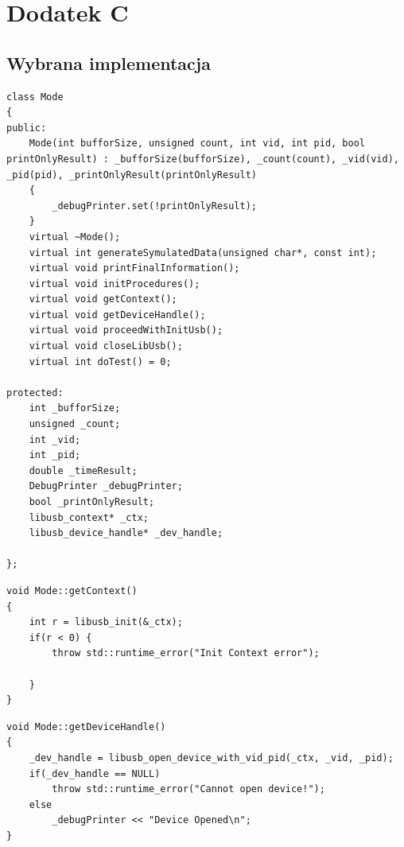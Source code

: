 \documentclass{BscUS}
\begin{document}
\chapter*{Dodatek C} \label{App:AppendixB}
\section*{Wybrana implementacja}


\begin{lstlisting}[caption={Deklaracja klasy Mode.},label={lst:CMode}]
class Mode
{
public:
	Mode(int bufforSize, unsigned count, int vid, int pid, bool printOnlyResult) : _bufforSize(bufforSize), _count(count), _vid(vid), _pid(pid), _printOnlyResult(printOnlyResult)
	{
		_debugPrinter.set(!printOnlyResult);
	}
	virtual ~Mode();
	virtual int generateSymulatedData(unsigned char*, const int);
	virtual void printFinalInformation();
	virtual void initProcedures();
	virtual void getContext();
	virtual void getDeviceHandle();
	virtual void proceedWithInitUsb();
	virtual void closeLibUsb();
	virtual int doTest() = 0;
	
protected:
	int _bufforSize;
	unsigned _count;
	int _vid;
	int _pid;
	double _timeResult;
	DebugPrinter _debugPrinter;
	bool _printOnlyResult;
	libusb_context* _ctx;
	libusb_device_handle* _dev_handle;

};
\end{lstlisting}
\begin{lstlisting}[caption={Metoda Mode::getContext().},label={lst:Mode_getContext}]
void Mode::getContext()
{	
	int r = libusb_init(&_ctx);
	if(r < 0) {
		throw std::runtime_error("Init Context error");

	}
}
\end{lstlisting}
\begin{lstlisting}[caption={Metoda Mode::getDeviceHandler().},label={lst:Mode_getDeviceHandle}]
void Mode::getDeviceHandle()
{
	_dev_handle = libusb_open_device_with_vid_pid(_ctx, _vid, _pid);
	if(_dev_handle == NULL)
		throw std::runtime_error("Cannot open device!");
	else
		_debugPrinter << "Device Opened\n";
}
\end{lstlisting}
\end{document}
